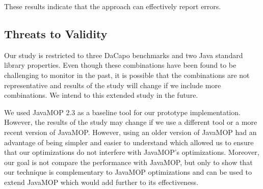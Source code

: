These results indicate that the approach can effectively report errors.




\subsection{Threats to Validity}
\label{subsec:threats}

Our study is restricted to three DaCapo benchmarks and two Java standard library 
properties. Even though these combinations have been found to be challenging to 
monitor in the past, it is possible that the combinations are not representative 
and results of the study will change if we include more combinations. We intend 
to this extended study in the future.

We used JavaMOP 2.3 as a baseline tool for our prototype implementation. 
However, the results of the study may change if we use a different tool or a 
more recent version of JavaMOP. However, using an older version of JavaMOP had 
an advantage of being simpler and easier to understand which allowed us to 
ensure that our optimizations do not interfere with JavaMOP's optimizations. 
Moreover, our goal is not compare the performance with JavaMOP, but only to show 
that our technique is complementary to JavaMOP optimizations and can be used to 
extend JavaMOP which would add further to its effectiveness.

